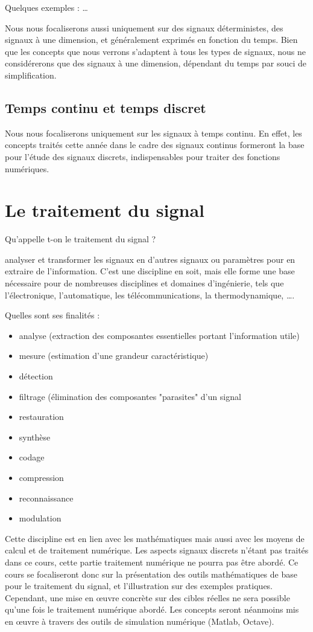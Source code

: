 \documentclass[]{report}
\begin{document}
	Quelques exemples : \ldots{}
	
	Nous nous focaliserons aussi uniquement sur des signaux déterministes,
	des signaux à une dimension, et généralement exprimés en fonction du
	temps. Bien que les concepts que nous verrons s'adaptent à tous les
	types de signaux, nous ne considérerons que des signaux à une dimension,
	dépendant du temps par souci de simplification.
	
	\subsection{Temps continu et temps discret}
	Nous nous focaliserons uniquement sur les signaux à temps continu. En
	effet, les concepts traités cette année dans le cadre des signaux
	continus formeront la base pour l'étude des signaux discrets,
	indispensables pour traiter des fonctions numériques.
	
	\section{Le traitement du signal}
	Qu'appelle t-on le traitement du signal ?
	
	analyser et transformer les signaux en d'autres signaux ou paramètres pour en extraire de l'information.
	C'est une discipline en soit, mais elle forme une base nécessaire pour de nombreuses disciplines et domaines d'ingénierie, tels que l'électronique, l'automatique, les télécommunications, la thermodynamique, ….
	
	Quelles sont ses finalités :
	
	\begin{itemize}
		\item analyse (extraction des composantes essentielles portant l'information utile)
		\item mesure (estimation d'une grandeur caractéristique)
		\item détection
		\item filtrage (élimination des composantes "parasites" d'un signal
		\item restauration
		\item synthèse
		\item codage
		\item compression
		\item reconnaissance
		\item modulation
	\end{itemize}
	
	Cette discipline est en lien avec les mathématiques mais aussi avec les moyens de calcul et de traitement numérique.
	Les aspects signaux discrets n'étant pas traités dans ce cours, cette partie traitement numérique ne pourra pas être abordé. Ce cours se focaliseront donc sur la présentation des outils mathématiques de base pour le traitement du signal, et l'illustration sur des exemples pratiques. Cependant, une mise en œuvre concrète sur des cibles réelles ne sera possible qu'une fois le traitement numérique abordé.
	Les concepts seront néanmoins mis en œuvre à travers des outils de simulation numérique (Matlab, Octave).
	
\end{document}
